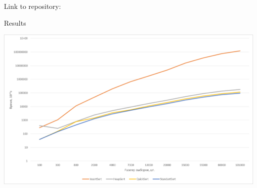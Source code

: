 Link to repository\+:

Results 
\begin{DoxyImageNoCaption}
  \mbox{\includegraphics[width=\textwidth,height=\textheight/2,keepaspectratio=true]{graph.png}}
\end{DoxyImageNoCaption}
 